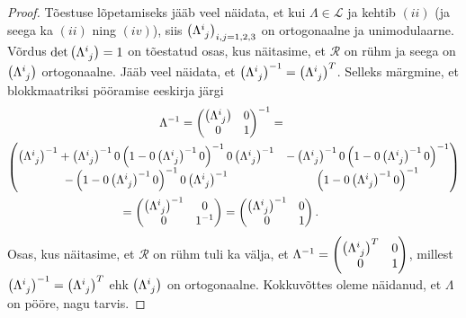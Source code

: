 \documentclass[12pt]{article}
\theoremstyle{plain}
\theoremstyle{definition}
\numberwithin{equation}{section}
\def\L{{\mathcal L}}
\begin{document}
\begin{proof}
Tõestuse lõpetamiseks jääb veel näidata, et kui 
$\Lambda \in \L$ ja kehtib $(ii)$ (ja seega ka $(ii)$ ning 
$(iv)$), siis $\left(\Lambda\indices{^i_j}\right)_{i,j = 1, 2, 3}$ 
on ortogonaalne ja unimodulaarne. Võrdus 
$\det \left(\Lambda\indices{^i_j}\right) = 1$ on tõestatud osas, kus 
näitasime, et $\mathcal{R}$ on rühm ja seega on 
$\left(\Lambda\indices{^i_j}\right)$ ortogonaalne. 
Jääb veel näidata, et $\left(\Lambda\indices{^i_j}\right)^{-1} = 
\left(\Lambda\indices{^i_j}\right)^T$. Selleks märgmine, et 
blokkmaatriksi pööramise eeskirja järgi
\begin{align*}
\Lambda^{-1} = 
\begin{pmatrix}
\left(\Lambda\indices{^i_j}\right) & 0 \\
0 & 1 \\ 
\end{pmatrix}^{-1} = 
\qquad\qquad\qquad\qquad\qquad\qquad\qquad\quad\\
\begin{pmatrix}
\left(\Lambda\indices{^i_j}\right)^{-1} + 
\left(\Lambda\indices{^i_j}\right)^{-1} 0 
\left(1-0 \left(\Lambda\indices{^i_j}\right)
^{-1} 0 \right)^{-1} 0 \left(\Lambda\indices{^i_j}\right)^{-1} & 
-\left(\Lambda\indices{^i_j}\right)^{-1} 0 \left(1 - 0 \left
(\Lambda\indices{^i_j}\right)^{-1} 0 \right)^{-1} \\
-\left(1 - 0 \left(\Lambda\indices{^i_j}\right)^{-1} 0\right)^{-1} 0 
\left(\Lambda\indices{^i_j}\right)^{-1} & \left(1 - 0 \left
(\Lambda\indices{^i_j}\right)^{-1} 0 \right)^{-1} \\
\end{pmatrix} \\
 = \begin{pmatrix}
\left(\Lambda\indices{^i_j}\right)^{-1} & 0 \\
0 & 1^{-1} \\ 
\end{pmatrix} = 
\begin{pmatrix}
\left(\Lambda\indices{^i_j}\right)^{-1} & 0 \\
0 & 1 \\ 
\end{pmatrix}. \qquad\qquad\qquad\qquad\qquad\qquad
\end{align*}
Osas, kus näitasime, et $\mathcal{R}$ on rühm tuli ka välja, et 
$\Lambda^{-1} = \begin{pmatrix} \left(\Lambda\indices{^i_j}\right)^T 
& 0 \\ 0 & 1 \\ \end{pmatrix}$, millest 
$\left(\Lambda\indices{^i_j}\right)^{-1} = 
\left(\Lambda\indices{^i_j}\right)^T$ ehk 
$\left(\Lambda\indices{^i_j}\right)$ on ortogonaalne. Kokkuvõttes 
oleme näidanud, et $\Lambda$ on pööre, nagu tarvis.
\end{proof}
\end{document}
